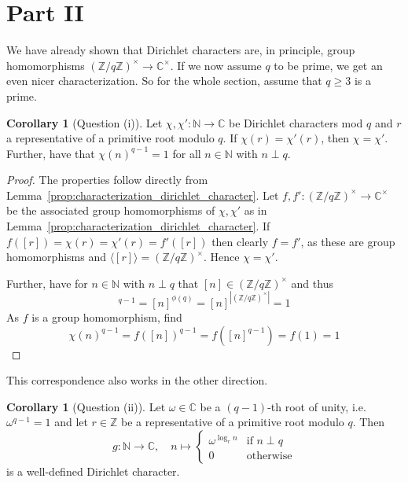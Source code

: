 \documentclass{scrartcl}
\newcommand{\N}{\mathbb{N}}
\newcommand{\Z}{\mathbb{Z}}
\newcommand{\C}{\mathbb{C}}
\newcommand{\units}{\times}
\theoremstyle{definition}
\newtheorem{corollary}[definition]{Corollary}
\begin{document}
\section{Part II}
We have already shown that Dirichlet characters are, in principle, group homomorphisms $(\Z/q\Z)^\units \to \C^\units$.
If we now assume $q$ to be prime, we get an even nicer characterization.
So for the whole section, assume that $q \geq 3$ is a prime.
\begin{corollary}[Question (i)]
    \label{prop:dirichlet_character_image_group}
    Let $\chi, \chi': \N \to \C$ be Dirichlet characters mod $q$ and $r$ a representative of a primitive root modulo $q$.
    If $\chi(r) = \chi'(r)$, then $\chi = \chi'$.
    Further, have that $\chi(n)^{q - 1} = 1$ for all $n \in \N$ with $n \perp q$.
\end{corollary}
\begin{proof}
    The properties follow directly from Lemma~\ref{prop:characterization_dirichlet_character}.
    Let $f, f': (\Z/q\Z)^\units \to \C^\units$ be the associated group homomorphisms of $\chi, \chi'$ as in Lemma~\ref{prop:characterization_dirichlet_character}.
    If $f([r]) = \chi(r) = \chi'(r) = f'([r])$ then clearly $f = f'$, as these are group homomorphisms and $\langle [r] \rangle = (\Z/q\Z)^\units$.
    Hence $\chi = \chi'$.

    Further, have for $n \in \N$ with $n \perp q$ that $[n] \in (\Z/q\Z)^\units$ and thus
    \begin{equation*}
        [n]^{q - 1} = [n]^{\phi(q)} = [n]^{|(\Z/q\Z)^\units|} = 1 
    \end{equation*}
    As $f$ is a group homomorphism, find
    \begin{equation*}
        \chi(n)^{q - 1} = f([n])^{q - 1} = f([n]^{q - 1}) = f(1) = 1
    \end{equation*}
\end{proof}
This correspondence also works in the other direction.
\begin{corollary}[Question (ii)]
    \label{prop:dirichlet_character_primitive_root}
    Let $\omega \in \C$ be a $(q - 1)$-th root of unity, i.e. $\omega^{q - 1} = 1$ and let $r \in \Z$ be a representative of a primitive root modulo $q$.
    Then
    \begin{equation*}
        g: \N \to \C, \quad n \mapsto \begin{cases}
            \omega^{\log_r n} & \text{if $n \perp q$} \\
            0 & \text{otherwise}
        \end{cases}
    \end{equation*}
    is a well-defined Dirichlet character.
\end{corollary}
\end{document}
